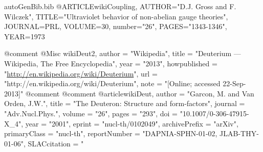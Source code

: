 \begin{filecontents*}{autoGenBib.bib}
@ARTICLE{wikiCoupling,
   AUTHOR="D.J. Gross and F. Wilczek", 
   TITLE="Ultraviolet behavior of non-abelian gauge theories",
   JOURNAL=PRL,
   VOLUME=30,   
   number="26",
   PAGES="1343-1346",
   YEAR=1973  
}

@comment %
@Misc{ wikiDeut2,
  author = "Wikipedia",
  title = "Deuterium --- {W}ikipedia{,} The Free Encyclopedia",
  year = "2013",
  howpublished = "\url{http://en.wikipedia.org/wiki/Deuterium}",
  url = "http://en.wikipedia.org/wiki/Deuterium",
  note = "[Online; accessed 22-Sep-2013]"
}	
@comment %
@comment %
@article{wikiDeut,
      author         = "Garcon, M. and Van Orden, J.W.",
      title          = "{The Deuteron: Structure and form-factors}",
      journal        = "Adv.Nucl.Phys.",
      volume         = "26",
      pages          = "293",
      doi            = "10.1007/0-306-47915-X_4",
      year           = "2001",
      eprint         = "nucl-th/0102049",
      archivePrefix  = "arXiv",
      primaryClass   = "nucl-th",
      reportNumber   = "DAPNIA-SPHN-01-02, JLAB-THY-01-06",
      SLACcitation   = "%
}


\end{filecontents*}
